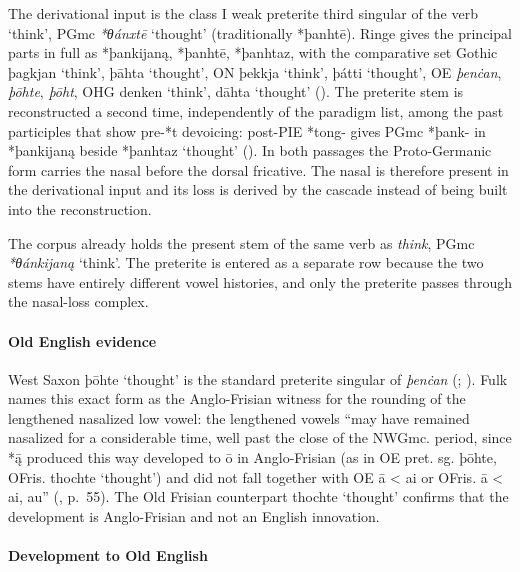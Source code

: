 \documentclass[
  british,
  a4paper,
]{article}
\providecommand{\Recon}[1]{\emph{*#1}}
\begin{document}
The derivational input is the class I weak preterite third singular of
the verb `think', PGmc \Recon{θánxtē} `thought' (traditionally *þanhtē).
Ringe gives the principal parts in full as *þankijaną, *þanhtē,
*þanhtaz, with the comparative set Gothic {þagkjan} `think', {þāhta}
`thought', ON {þekkja} `think', {þátti} `thought', OE \emph{þenċan},
\emph{þōhte}, \emph{þōht}, OHG {denken} `think', {dāhta} `thought'
(). The preterite stem is
reconstructed a second time, independently of the paradigm list, among
the past participles that show pre-*t devoicing: post-PIE *tong- gives
PGmc *þank- in *þankijaną beside *þanhtaz `thought'
(). In both passages the
Proto-Germanic form carries the nasal before the dorsal fricative. The
nasal is therefore present in the derivational input and its loss is
derived by the cascade instead of being built into the reconstruction.

The corpus already holds the present stem of the same verb as
\emph{think}, PGmc \Recon{θánkijaną} `think'. The preterite is entered
as a separate row because the two stems have entirely different vowel
histories, and only the preterite passes through the nasal-loss complex.

\paragraph{Old English evidence}\label{old-english-evidence-76}

West Saxon {þōhte} `thought' is the standard preterite singular of
\emph{þenċan} (;
). Fulk names
this exact form as the Anglo-Frisian witness for the rounding of the
lengthened nasalized low vowel: the lengthened vowels ``may have
remained nasalized for a considerable time, well past the close of the
NWGmc. period, since *ą̄ produced this way developed to ō in
Anglo-Frisian (as in OE pret. sg. þōhte, OFris. thochte `thought') and
did not fall together with OE ā \textless{} ai or OFris. ā \textless{}
ai, au'' (, p.~55). The Old
Frisian counterpart {thochte} `thought' confirms that the development is
Anglo-Frisian and not an English innovation.

\paragraph{Development to Old
English}\label{development-to-old-english-76}
\end{document}
